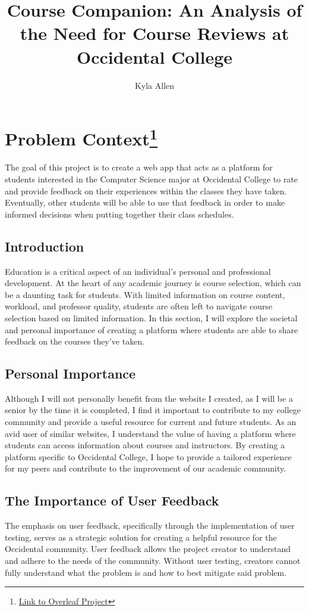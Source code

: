 \documentclass[10pt,twocolumn]{article}
\title{Course Companion: An Analysis of the Need for Course Reviews at Occidental College}
\author{Kyla Allen}
\affiliation{Occidental College}
\begin{document}
\maketitle

\section{Problem Context\footnote{\href{https://www.overleaf.com/8949248344rhtkzfvbcxjs}{Link to Overleaf Project}}}
The goal of this project is to create a web app that acts as a platform for students interested in the Computer Science major at Occidental College to rate and provide feedback on their experiences within the classes they have taken. Eventually, other students will be able to use that feedback in order to make informed decisions when putting together their class schedules.

\subsection{Introduction}
Education is a critical aspect of an individual's personal and professional development. At the heart of any academic journey is course selection, which can be a daunting task for students. With limited information on course content, workload, and professor quality, students are often left to navigate course selection based on limited information. In this section, I will explore the societal and personal importance of creating a platform where students are able to share feedback on the courses they've taken.

\subsection{Personal Importance}
Although I will not personally benefit from the website I created, as I will be a senior by the time it is completed, I find it important to contribute to my college community and provide a useful resource for current and future students. As an avid user of similar websites, I understand the value of having a platform where students can access information about courses and instructors. By creating a platform specific to Occidental College, I hope to provide a tailored experience for my peers and contribute to the improvement of our academic community.


\subsection{The Importance of User Feedback}
The emphasis on user feedback, specifically through the implementation of user testing, serves as a strategic solution for creating a helpful resource for the Occidental community. User feedback allows the project creator to understand and adhere to the needs of the community. Without user testing, creators cannot fully understand what the problem is and how to best mitigate said problem.
\end{document}
